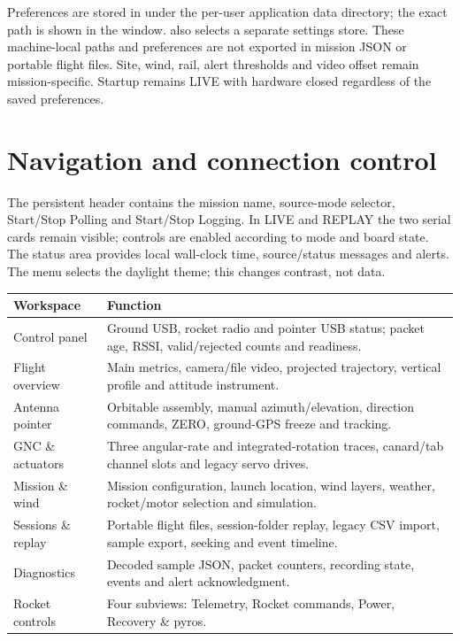 Preferences are stored in  under the per-user application
data directory; the exact path is shown in the window.  also
selects a separate settings store. These machine-local paths and preferences
are not exported in mission JSON or portable flight files. Site, wind, rail,
alert thresholds and video offset remain mission-specific. Startup remains
LIVE with hardware closed regardless of the saved preferences.

\section{Navigation and connection control}
The persistent header contains the mission name, source-mode selector,
Start/Stop Polling and Start/Stop Logging. In LIVE and REPLAY the two serial cards
remain visible; controls are enabled according to mode and board state. The
status area provides local wall-clock time, source/status messages and alerts.
The  menu selects the daylight theme; this changes contrast, not data.

\begin{longtable}{@{}L{.23\linewidth}L{.70\linewidth}@{}}
\toprule Workspace & Function \\\midrule\endhead
Control panel & Ground USB, rocket radio and pointer USB status; packet age, RSSI, valid/rejected counts and readiness. \\
Flight overview & Main metrics, camera/file video, projected trajectory, vertical profile and attitude instrument. \\
Antenna pointer & Orbitable assembly, manual azimuth/elevation, direction commands, ZERO, ground-GPS freeze and tracking. \\
GNC \& actuators & Three angular-rate and integrated-rotation traces, canard/tab channel slots and legacy servo drives. \\
Mission \& wind & Mission configuration, launch location, wind layers, weather, rocket/motor selection and simulation. \\
Sessions \& replay & Portable flight files, session-folder replay, legacy CSV import, sample export, seeking and event timeline. \\
Diagnostics & Decoded sample JSON, packet counters, recording state, events and alert acknowledgment. \\
Rocket controls & Four subviews: Telemetry, Rocket commands, Power, Recovery \& pyros. \\
\bottomrule
\end{longtable}

